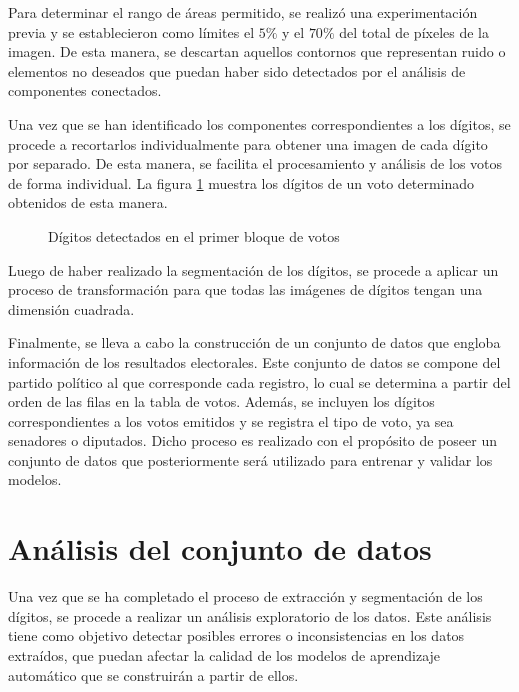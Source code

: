 Para determinar el rango de áreas permitido, se realizó una experimentación previa y se establecieron como límites el
$5\%$ y el $70\%$ del total de píxeles de la imagen. De esta manera, se descartan aquellos contornos que representan
ruido o elementos no deseados que puedan haber sido detectados por el análisis de componentes conectados.

Una vez que se han identificado los componentes correspondientes a los dígitos, se procede a recortarlos
individualmente para obtener una imagen de cada dígito por separado. De esta manera, se facilita el procesamiento y
análisis de los votos de forma individual. La figura \ref{fig:etl-4-digitos} muestra los dígitos de un voto determinado
obtenidos de esta manera.

\begin{figure}[H]
    \centering
    \caption[Dígitos detectados en el primer bloque de votos]{Dígitos detectados en el primer bloque de votos}
    \label{fig:etl-4-digitos}
\end{figure}

Luego de haber realizado la segmentación de los dígitos, se procede a aplicar un proceso de transformación para que
todas las imágenes de dígitos tengan una dimensión cuadrada.

Finalmente, se lleva a cabo la construcción de un conjunto de datos que engloba información de los resultados
electorales. Este conjunto de datos se compone del partido político al que corresponde cada registro, lo cual se
determina a partir del orden de las filas en la tabla de votos. Además, se incluyen los dígitos correspondientes a los
votos emitidos y se registra el tipo de voto, ya sea senadores o diputados. Dicho proceso es realizado con el propósito
de poseer un conjunto de datos que posteriormente será utilizado para entrenar y validar los modelos.

\section{Análisis del conjunto de datos}

Una vez que se ha completado el proceso de extracción y segmentación de los dígitos, se procede a realizar un análisis
exploratorio de los datos. Este análisis tiene como objetivo detectar posibles errores o inconsistencias en los datos
extraídos, que puedan afectar la calidad de los modelos de aprendizaje automático que se construirán a partir de ellos.

